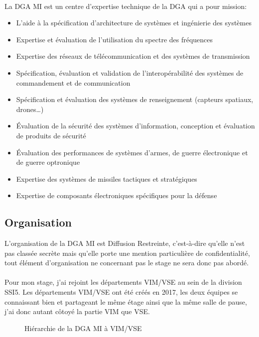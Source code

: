 \documentclass[11pt, book, english, french, standardlists]{upmethodology-document}
\begin{document}
				\paragraph*{}
					La \gls{DGA MI} est un centre d'expertise technique de la \gls{DGA} qui a pour mission:
					\begin{itemize}
						\item L'aide à la spécification d'architecture de systèmes et ingénierie des systèmes
						\item Expertise et évaluation de l'utilisation du spectre des fréquences
						\item Expertise des réseaux de télécommunication et des systèmes de transmission
						\item Spécification, évaluation et validation de l'interopérabilité des systèmes de commandement et de communication
						\item Spécification et évaluation des systèmes de renseignement (capteurs spatiaux, drones\ldots)
						\item Évaluation de la sécurité des systèmes d'information, conception et évaluation de produits de sécurité
						\item Évaluation des performances de systèmes d'armes, de guerre électronique et de guerre optronique
						\item Expertise des systèmes de missiles tactiques et stratégiques
						\item Expertise de composants électroniques spécifiques pour la défense
					\end{itemize}
			\subsection{Organisation}
				\begin{upminfo}
					L'organisation de la \gls{DGA MI} est Diffusion Restreinte, c'est-à-dire qu'elle n'est pas classée secrète mais qu'elle porte une mention particulière de confidentialité, tout élément d'organisation ne concernant pas le stage ne sera donc pas abordé.
				\end{upminfo}
				\paragraph*{}
					Pour mon stage, j'ai rejoint les départements \gls{VIM/VSE} au sein de la division \gls{SSI}5. Les départements \gls{VIM/VSE} ont été créés en 2017, les deux équipes se connaissant bien et partageant le même étage ainsi que la même salle de pause, j'ai donc autant côtoyé la partie VIM que VSE.
				\begin{figure}[H]
					\centering
					\caption{Hiérarchie de la \acrshort{DGA MI} à \acrshort{VIM/VSE}}
					\label{fig:Hierarchie_DGA_MI_a_VIM}
				\end{figure}
\end{document}
